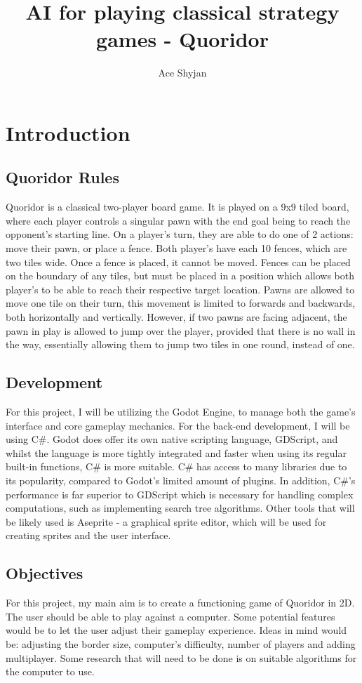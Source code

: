\documentclass[review]{cmpreport}
\title{AI for playing classical strategy games - Quoridor}
\author{Ace Shyjan}
\begin{document}
\section{Introduction}

\subsection{Quoridor Rules}
Quoridor is a classical two-player board game. It is played on a 9x9 tiled board, where each player controls a singular pawn with the end goal being to reach the opponent's starting line. On a player's turn, they are able to do one of 2 actions: move their pawn, or place a fence. Both player's have each 10 fences, which are two tiles wide. Once a fence is placed, it cannot be moved. Fences can be placed on the boundary of any tiles, but must be placed in a position which allows both player's to be able to reach their respective target location. Pawns are allowed to move one tile on their turn, this movement is limited to forwards and backwards, both horizontally and vertically. However, if two pawns are facing adjacent, the pawn in play is allowed to jump over the player, provided that there is no wall in the way, essentially allowing them to jump two tiles in one round, instead of one. 

\subsection{Development}
For this project, I will be utilizing the Godot Engine, to manage both the game's interface and core gameplay mechanics. For the back-end development, I will be using C\#. Godot does offer its own native scripting language, GDScript, and whilst the language is more tightly integrated and faster when using its regular built-in functions, C\# is more suitable. C\# has access to many libraries due to its popularity, compared to Godot's limited amount of plugins. In addition, C\#'s performance is far superior to GDScript which is necessary for handling complex computations, such as implementing search tree algorithms. Other tools that will be likely used is Aseprite - a graphical sprite editor, which will be used for creating sprites and the user interface.

\subsection{Objectives}
For this project, my main aim is to create a functioning game of Quoridor in 2D. The user should be able to play against a computer. Some potential features would be to let the user adjust their gameplay experience. Ideas in mind would be: adjusting the border size, computer's difficulty, number of players and adding multiplayer. Some research that will need to be done is on suitable algorithms for the computer to use.
\end{document}
